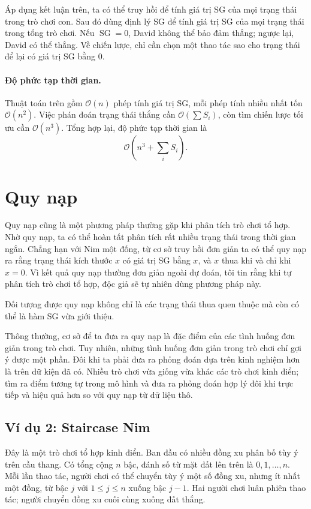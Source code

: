 \documentclass[11pt]{article}
\newcommand{\SG}{\operatorname{SG}}
\newcommand{\Oh}{\mathcal{O}}
\begin{document}
Áp dụng kết luận trên, ta có thể truy hồi để tính giá trị SG của mọi trạng thái
trong trò chơi con. Sau đó dùng định lý SG để tính giá trị SG của mọi trạng
thái trong tổng trò chơi. Nếu \(\SG=0\), David không thể bảo đảm thắng; ngược
lại, David có thể thắng. Về chiến lược, chỉ cần chọn một thao tác sao cho trạng
thái để lại có giá trị SG bằng 0.

\paragraph{Độ phức tạp thời gian.}
Thuật toán trên gồm \(\Oh(n)\) phép tính giá trị SG, mỗi phép tính nhiều nhất
tốn \(\Oh(n^2)\). Việc phán đoán trạng thái thắng cần \(\Oh(\sum S_i)\), còn
tìm chiến lược tối ưu cần \(\Oh(n^3)\). Tổng hợp lại, độ phức tạp thời gian là
\[
  \Oh\!\left(n^3+\sum_i S_i\right).
\]

\section{Quy nạp}

Quy nạp cũng là một phương pháp thường gặp khi phân tích trò chơi tổ hợp. Nhờ
quy nạp, ta có thể hoàn tất phân tích rất nhiều trạng thái trong thời gian
ngắn. Chẳng hạn với Nim một đống, từ cơ sở truy hồi đơn giản ta có thể quy nạp
ra rằng trạng thái kích thước \(x\) có giá trị SG bằng \(x\), và \(x\) thua khi
và chỉ khi \(x=0\). Vì kết quả quy nạp thường đơn giản ngoài dự đoán, tôi tin
rằng khi tự phân tích trò chơi tổ hợp, độc giả sẽ tự nhiên dùng phương pháp này.

Đối tượng được quy nạp không chỉ là các trạng thái thua quen thuộc mà còn có
thể là hàm SG vừa giới thiệu.

Thông thường, cơ sở để ta đưa ra quy nạp là đặc điểm của các tình huống đơn
giản trong trò chơi. Tuy nhiên, những tình huống đơn giản trong trò chơi chỉ
gợi ý được một phần. Đôi khi ta phải đưa ra phỏng đoán dựa trên kinh nghiệm
hơn là trên dữ kiện đã có. Nhiều trò chơi vừa giống vừa khác các trò chơi kinh
điển; tìm ra điểm tương tự trong mô hình và đưa ra phỏng đoán hợp lý đôi khi
trực tiếp và hiệu quả hơn so với quy nạp từ dữ liệu thô.

\subsection*{Ví dụ 2: Staircase Nim}

Đây là một trò chơi tổ hợp kinh điển. Ban đầu có nhiều đồng xu phân bố tùy ý
trên cầu thang. Có tổng cộng \(n\) bậc, đánh số từ mặt đất lên trên là
\(0,1,\ldots,n\). Mỗi lần thao tác, người chơi có thể chuyển tùy ý một số đồng
xu, nhưng ít nhất một đồng, từ bậc \(j\) với \(1\le j\le n\) xuống bậc
\(j-1\). Hai người chơi luân phiên thao tác; người chuyển đồng xu cuối cùng
xuống đất thắng.
\end{document}
